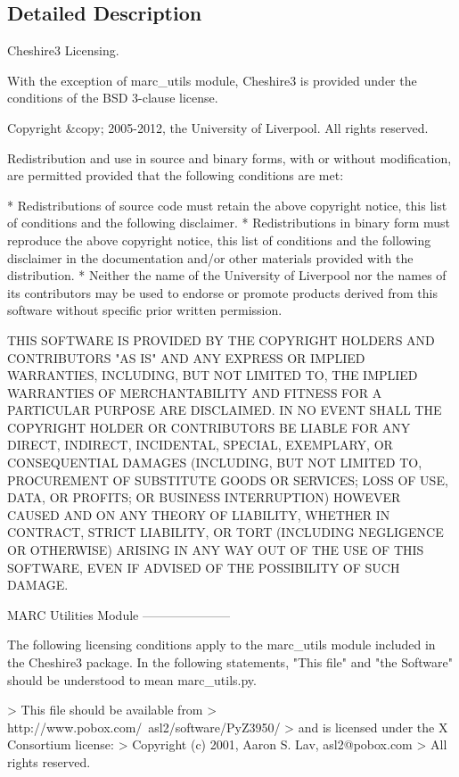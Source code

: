 \subsection{Detailed Description}
\begin{DoxyVerb}Cheshire3 Licensing.

With the exception of marc_utils module, Cheshire3 is provided under the
conditions of the BSD 3-clause license.

Copyright &copy; 2005-2012, the University of Liverpool.
All rights reserved.

Redistribution and use in source and binary forms, with or without 
modification, are permitted provided that the following conditions are met:

 * Redistributions of source code must retain the above copyright notice, 
   this list of conditions and the following disclaimer.
 * Redistributions in binary form must reproduce the above copyright notice, 
   this list of conditions and the following disclaimer in the documentation 
   and/or other materials provided with the distribution.
 * Neither the name of the University of Liverpool nor the names of its 
   contributors may be used to endorse or promote products derived from this 
   software without specific prior written permission.
 
THIS SOFTWARE IS PROVIDED BY THE COPYRIGHT HOLDERS AND CONTRIBUTORS "AS IS" 
AND ANY EXPRESS OR IMPLIED WARRANTIES, INCLUDING, BUT NOT LIMITED TO, THE 
IMPLIED WARRANTIES OF MERCHANTABILITY AND FITNESS FOR A PARTICULAR PURPOSE ARE 
DISCLAIMED. IN NO EVENT SHALL THE COPYRIGHT HOLDER OR CONTRIBUTORS BE LIABLE 
FOR ANY DIRECT, INDIRECT, INCIDENTAL, SPECIAL, EXEMPLARY, OR CONSEQUENTIAL 
DAMAGES (INCLUDING, BUT NOT LIMITED TO, PROCUREMENT OF SUBSTITUTE GOODS OR 
SERVICES; LOSS OF USE, DATA, OR PROFITS; OR BUSINESS INTERRUPTION) HOWEVER 
CAUSED AND ON ANY THEORY OF LIABILITY, WHETHER IN CONTRACT, STRICT LIABILITY, 
OR TORT (INCLUDING NEGLIGENCE OR OTHERWISE) ARISING IN ANY WAY OUT OF THE USE 
OF THIS SOFTWARE, EVEN IF ADVISED OF THE POSSIBILITY OF SUCH DAMAGE.


MARC Utilities Module
---------------------

The following licensing conditions apply to the marc_utils module included in
the Cheshire3 package. In the following statements, "This file" and "the
Software" should be understood to mean marc_utils.py.

> This file should be available from
> http://www.pobox.com/~asl2/software/PyZ3950/
> and is licensed under the X Consortium license:
> Copyright (c) 2001, Aaron S. Lav, asl2@pobox.com
> All rights reserved. 


\end{DoxyVerb}
